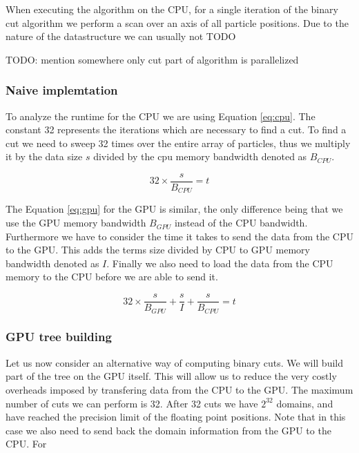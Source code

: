 \documentclass[]{article}
\begin{document}
When executing the algorithm on the CPU, for a single iteration of the binary cut algorithm we perform a scan over an axis of all particle positions. Due to the nature of the datastructure we can usually not  TODO 

TODO: mention somewhere only cut part of algorithm is parallelized

\subsubsection{Naive implemtation}

To analyze the runtime for the CPU we are using Equation \ref{eq:cpu}. The constant 32 represents the iterations which are necessary to find a cut. To find a cut we need to sweep 32 times over the entire array of particles, thus we multiply it by the data size $s$ divided by the cpu memory bandwidth denoted as $B_{CPU}$.

\begin{center}
	\begin{equation}
			32 \times \frac{ s }{B_{CPU}} = t
			\label{eq:cpu}
	\end{equation}
\end{center}


The Equation \ref{eq:gpu} for the GPU is similar, the only difference being that we use the GPU memory bandwidth $B_{GPU}$ instead of the CPU bandwidth. Furthermore we have to consider the time it takes to send the data from the CPU to the GPU. This adds the terms size divided by CPU to GPU memory bandwidth denoted as $I$. Finally we also need to load the data from the CPU memory to the CPU before we are able to send it. 

\begin{center}
	\begin{equation}
		32 \times \frac{s}{B_{GPU}} + \frac{s}{I}  + \frac{s}{B_{CPU}}= t
		\label{eq:gpu}
	\end{equation}
\end{center}


\subsubsection{GPU tree building}

Let us now consider an alternative way of computing binary cuts. We will build part of the tree on the GPU itself. This will allow us to reduce the very costly overheads imposed by transfering data from the CPU to the GPU. The maximum number of cuts we can perform is 32. After 32 cuts we have $2^{32}$ domains, and have reached the precision limit of the floating point positions. Note that in this case we also need to send back the domain information from the GPU to the CPU. For 
\end{document}
